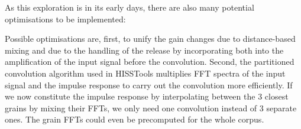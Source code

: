 As this exploration is in its early days, there are also many potential optimisations to be implemented:

Possible optimisations are, first, to unify the gain changes due to distance-based mixing and due to the handling of the release by incorporating both into the amplification of the input signal before the convolution.
Second, the partitioned convolution algorithm used in HISSTools multiplies FFT spectra of the input signal and the impulse response to carry out the convolution more efficiently.  If we now constitute the impulse response by interpolating between the 3 closest grains by mixing their FFTs, we only need one convolution instead of 3 separate ones.  The grain FFTs could even be precomputed for the whole corpus. %